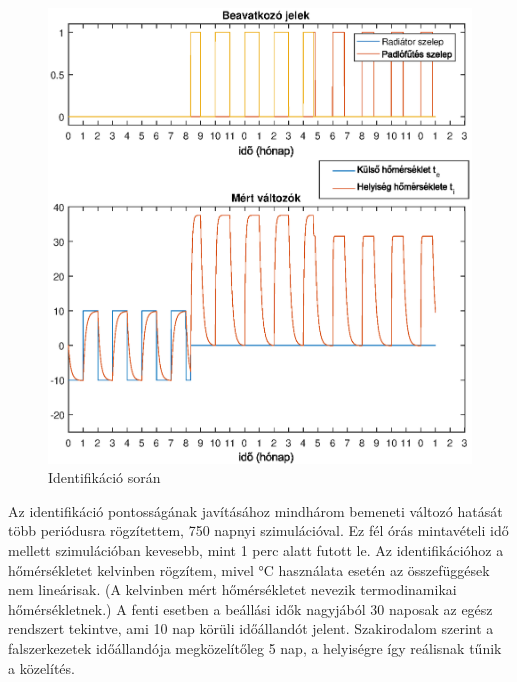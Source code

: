 



\begin{figure}[H]
	\centering
	\includegraphics[trim=0 0 0 0, clip,width=\textwidth]{figures/ident-valve3}
	\caption{Identifikáció során }
	\label{fig:ident}
\end{figure}

Az identifikáció pontosságának javításához mindhárom bemeneti változó hatását több periódusra rögzítettem, 750 napnyi szimulációval. Ez fél órás mintavételi idő mellett szimulációban kevesebb, mint 1 perc alatt futott le. Az identifikációhoz a hőmérsékletet kelvinben rögzítem, mivel \si{\celsius} használata esetén az összefüggések nem lineárisak. (A kelvinben mért hőmérsékletet nevezik termodinamikai hőmérsékletnek.) A fenti esetben a beállási idők nagyjából 30 naposak az egész rendszert tekintve, ami 10 nap körüli időállandót jelent. Szakirodalom szerint a falszerkezetek időállandója megközelítőleg 5 nap, a helyiségre így reálisnak tűnik a közelítés.

